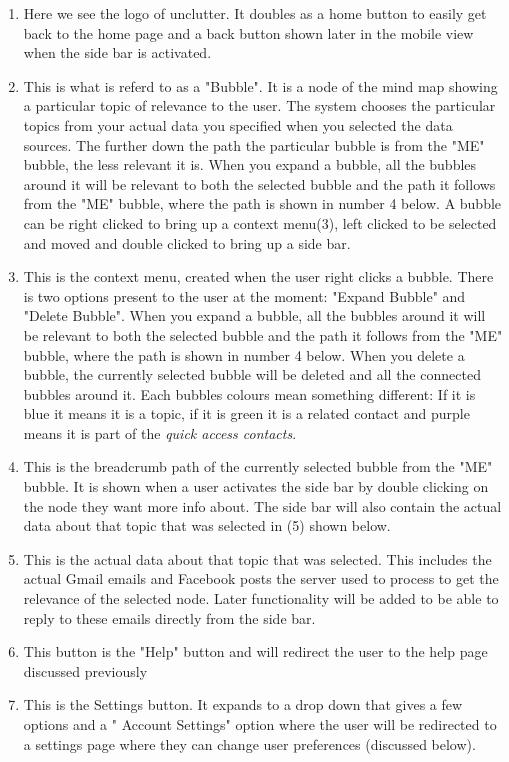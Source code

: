 \documentclass[hidelinks,english]{article}
\begin{document}
	\begin{enumerate}  
        \item Here we see the logo of unclutter. It doubles as a home button to easily get back to the home page and a back button shown later in the mobile view when the side bar is activated.
        \item This is what is referd to as a "Bubble". It is a node of the mind map showing a particular topic of relevance to the user. The system chooses the particular topics from your actual data you specified when you selected the data sources. The further down the path the particular bubble is from the "ME" bubble, the less relevant it is. When you expand a bubble, all the bubbles around it will be relevant to both the selected bubble and the path it follows from the "ME" bubble, where the path is shown in number 4 below. A bubble can be right clicked to bring up a context menu(3), left clicked to be selected and moved and double clicked to bring up a side bar.
        \item This is the context menu, created when the user right clicks a bubble. There is two options present to the user at the moment: "Expand Bubble" and "Delete Bubble". When you expand a bubble, all the bubbles around it will be relevant to both the selected bubble and the path it follows from the "ME" bubble, where the path is shown in number 4 below. When you delete a bubble, the currently selected bubble will be deleted and all the connected bubbles around it. Each bubbles colours mean something different: If it is blue it means it is a topic, if it is green it is a related contact and purple means it is part of the \textit{quick access contacts}.
        \item This is the breadcrumb path of the currently selected bubble from the "ME" bubble. It is shown when a user activates the side bar by double clicking on the node they want more info about. The side bar will also contain the actual data about that topic that was selected in (5) shown below.
        \item This is the actual data about that topic that was selected. This includes the actual Gmail emails and Facebook posts the server used to process to get the relevance of the selected node. Later functionality will be added to be able to reply to these emails directly from the side bar.
        \item This button is the "Help" button and will redirect the user to the help page discussed previously
        \item This is the Settings button. It expands to a drop down that gives a few options  and a " Account Settings" option where the user will be redirected to a settings page where they can change user preferences (discussed below).

\end{enumerate}
\end{document}
